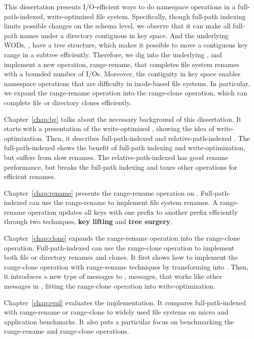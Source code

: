 This dissertation presents I/O-efficient ways to do namespace operations in a
full-path-indexed, write-optimized file system.
Specifically, though full-path indexing limits possible changes on the schema
level, we observe that it can make all full-path names under a directory
contiguous in key space.
And the underlying WODs, \bets, have a tree structure, which makes it possible
to move a contiguous key range in a subtree efficiently.
Therefore, we dig into the underlying \bets, and implement a new operation,
range-rename, that completes file system renames with a bounded number of I/Os.
Moreover, the contiguity in key space enables namespace operations that are
difficulty in inode-based file systems.
In particular, we expand the range-rename operation into the range-clone
operation, which can complete file or directory clones efficiently.

Chapter~\ref{chap:bg} talks about the necessary background of this dissertation.
It starts with a presentation of the write-optimized \bets,
showing the idea of write-optimization.
Then, it describes full-path-indexed \betrfs and relative-path-indexed \betrfs.
The full-path-indexed \betrfs shows the benefit of full-path indexing and
write-optimization, but suffers from slow renames.
The relative-path-indexed \betrfs has good rename performance, but breaks the
full-path indexing and taxes other operations for efficient renames.

Chapter~\ref{chap:rename} presents the range-rename operation on \bets.
Full-path-indexed \betrfs can use the range-rename to implement file system
renames.
A range-rename operation updates all keys with one prefix to another prefix
efficiently through two techniques,
\textbf{key lifting} and \textbf{tree surgery}.

Chapter~\ref{chap:clone} expands the range-rename operation into the
range-clone operation.
Full-path-indexed \betrfs can use the range-clone operation to implement both
file or directory renames and clones.
It first shows how to implement the range-clone operation with range-rename
techniques by transforming \bets into \bedags.
Then, it introduces a new type of messages to \bedags, \goto messages,
that works like other messages in \bedags,
fitting the range-clone operation into write-optimization.

Chapter~\ref{chap:eval} evaluates the implementation.
It compares full-path-indexed \betrfs with range-rename or range-clone to
widely used file systems on micro and application benchmarks.
It also puts a particular focus on benchmarking the range-rename and range-clone
operations.

